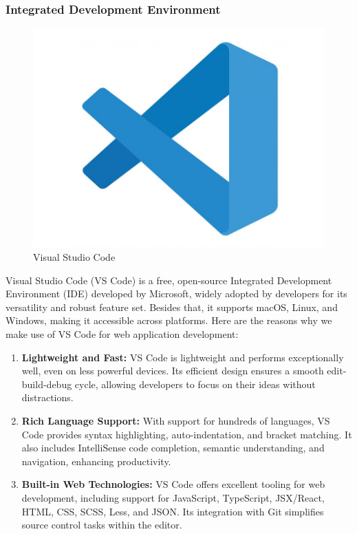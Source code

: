     \subsubsection{Integrated Development Environment}

    \begin{figure}[H]
			\centering
			\includegraphics[scale=0.1]{graphics/vscode-logo.jpg}
			\caption{Visual Studio Code}
			\label{fig:vsCode}
	\end{figure}
    
    Visual Studio Code (VS Code) is a free, open-source Integrated Development Environment (IDE) developed by Microsoft, widely adopted by developers for its versatility and robust feature set. Besides that, it supports macOS, Linux, and Windows, making it accessible across platforms. \cite{why_vscode} Here are the reasons why we make use of VS Code for web application development:

    \begin{enumerate}
        \item \textbf{Lightweight and Fast:} VS Code is lightweight and performs exceptionally well, even on less powerful devices. Its efficient design ensures a smooth edit-build-debug cycle, allowing developers to focus on their ideas without distractions. 

        \item \textbf{Rich Language Support:} With support for hundreds of languages, VS Code provides syntax highlighting, auto-indentation, and bracket matching. It also includes IntelliSense code completion, semantic understanding, and navigation, enhancing productivity. \cite{why_vscode}

        \item \textbf{Built-in Web Technologies:} VS Code offers excellent tooling for web development, including support for JavaScript, TypeScript, JSX/React, HTML, CSS, SCSS, Less, and JSON. Its integration with Git simplifies source control tasks within the editor. \cite{why_vscode}
        
    \end{enumerate}

